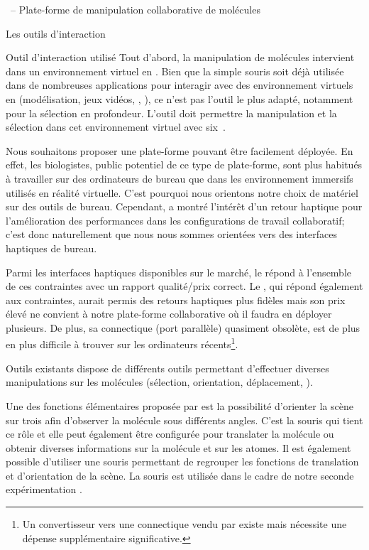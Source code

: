 \documentclass[myfrancais,ngerman,english,frenchb]{mythesis}
\begin{document}
\begin{mychapter}{\myShaddock\ -- Plate-forme de manipulation collaborative de molécules}
\begin{mysection}{Les outils d'interaction}
\begin{mysubsection}{Outil d'interaction utilisé}
				Tout d'abord, la manipulation de molécules intervient dans un environnement virtuel en \myThreeD.
				Bien que la simple souris soit déjà utilisée dans de nombreuses applications pour interagir avec des environnement virtuels en \myThreeD (modélisation, jeux vidéos, \myCAO, \myetc), ce n'est pas l'outil le plus adapté, notamment pour la sélection en profondeur.
				L'outil doit permettre la manipulation et la sélection dans cet environnement virtuel \myThreeD avec six~.

				Nous souhaitons proposer une plate-forme pouvant être facilement déployée.
				En effet, les biologistes, public potentiel de ce type de plate-forme, sont plus habitués à travailler sur des ordinateurs de bureau que dans les environnement immersifs utilisés en réalité virtuelle.
				C'est pourquoi nous orientons notre choix de matériel sur des outils de bureau.
				Cependant,  a montré l'intérêt d'un retour haptique pour l'amélioration des performances dans les configurations de travail collaboratif; c'est donc naturellement que nous nous sommes orientées vers des interfaces haptiques de bureau.

				Parmi les interfaces haptiques disponibles sur le marché, le \myOmni répond à l'ensemble de ces contraintes avec un rapport qualité/prix correct.
				Le \myDesktop, qui répond également aux contraintes, aurait permis des retours haptiques plus fidèles mais son prix élevé ne convient à notre plate-forme collaborative où il faudra en déployer plusieurs.
				De plus, sa connectique (port parallèle) quasiment obsolète, est de plus en plus difficile à trouver sur les ordinateurs récents\footnote{Un convertisseur vers une connectique \myFireWire vendu par \mySensAble existe mais nécessite une dépense supplémentaire significative.}.
			\end{mysubsection}
			\begin{mysubsection}{Outils existants}
				 dispose de différents outils permettant d'effectuer diverses manipulations sur les molécules (sélection, orientation, déplacement, \myetc).

				Une des fonctions élémentaires proposée par  est la possibilité d'orienter la scène sur trois  afin d'observer la molécule sous différents angles.
				C'est la souris qui tient ce rôle et elle peut également être configurée pour translater la molécule ou obtenir diverses informations sur la molécule et sur les atomes.
				Il est également possible d'utiliser une souris \myThreeD permettant de regrouper les fonctions de translation et d'orientation de la scène.
				La souris \myThreeD \mySpaceNavigator est utilisée dans le cadre de notre seconde expérimentation .


\end{mysubsection}
\end{mysection}
\end{mychapter}
\end{document}
